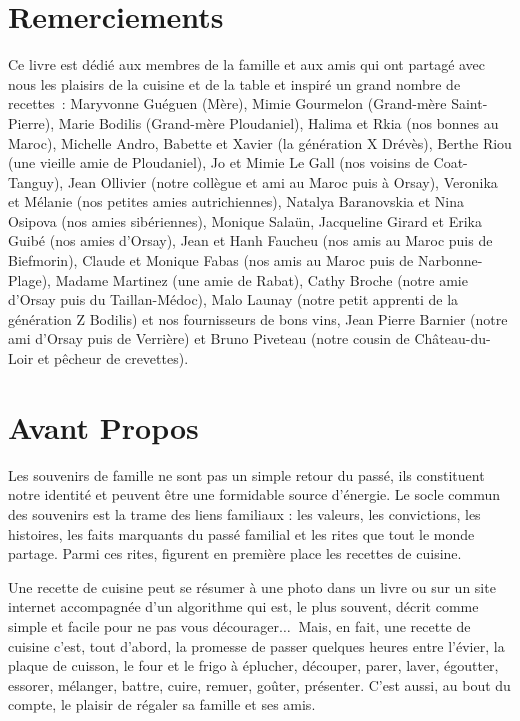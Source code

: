 


\section*{Remerciements}
Ce livre est dédié aux membres de la famille et aux amis qui ont partagé avec nous les plaisirs de la cuisine et de la table et inspiré un grand nombre de recettes :
Maryvonne Guéguen (Mère), Mimie Gourmelon (Grand-mère Saint-Pierre), Marie Bodilis (Grand-mère Ploudaniel), Halima et Rkia (nos  bonnes au Maroc),  Michelle Andro, Babette et Xavier (la génération X Drévès), Berthe Riou (une vieille amie de Ploudaniel), Jo et Mimie Le Gall (nos voisins de Coat-Tanguy), Jean Ollivier (notre collègue et ami au Maroc puis à Orsay), Veronika et Mélanie (nos petites amies autrichiennes), Natalya Baranovskia et Nina Osipova (nos amies sibériennes), Monique Salaün, Jacqueline Girard et Erika Guibé (nos amies d’Orsay), Jean et Hanh Faucheu (nos amis au Maroc puis de Biefmorin), Claude et Monique Fabas (nos amis au Maroc puis de Narbonne-Plage), Madame Martinez (une amie de Rabat), Cathy Broche (notre amie d’Orsay puis du Taillan-Médoc), Malo Launay (notre petit apprenti de la génération Z Bodilis) et nos fournisseurs de bons vins, Jean Pierre Barnier (notre ami d’Orsay puis de Verrière) et Bruno Piveteau (notre cousin de Château-du-Loir et pêcheur de crevettes).
\newpage
\ %
\newpage

\section*{Avant Propos}
Les souvenirs de famille ne sont pas un simple retour du passé, ils constituent notre identité et peuvent être une formidable source d’énergie. Le socle commun des souvenirs est la trame des liens familiaux : les valeurs, les convictions, les histoires, les faits marquants du passé familial et les rites que tout le monde partage. Parmi ces rites, figurent en première place les recettes de cuisine.

Une recette de cuisine peut se résumer à une photo dans un livre ou sur un site internet accompagnée d’un algorithme qui est, le plus souvent, décrit comme simple et facile pour ne pas vous décourager$\ldots~$ Mais, en fait, une recette de cuisine c’est, tout d'abord, la promesse de passer quelques heures entre l’évier, la plaque de cuisson, le four et le frigo à éplucher, découper, parer, laver, égoutter, essorer, mélanger, battre, cuire, remuer, goûter, présenter.
C'est aussi, au bout du compte, le plaisir de régaler sa famille et ses amis.

